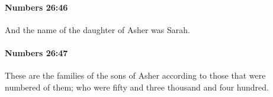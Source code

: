 		\paragraph{Numbers 26:46} %
			\label{NUMBERS-26-46}

			And the name of the daughter of Asher was Sarah.


		\paragraph{Numbers 26:47} %
			\label{NUMBERS-26-47}

			These are the families of the sons of Asher according to those that were numbered of them; who were fifty and three thousand and four hundred.


